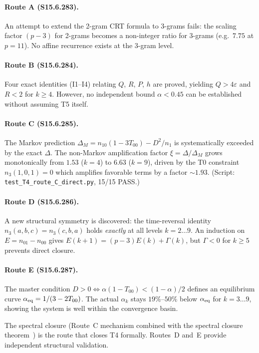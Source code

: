 \documentclass[12pt,a4paper]{article}
\begin{document}
\paragraph{Route A (S15.6.283).}
An attempt to extend the 2-gram CRT formula to 3-grams fails: the
scaling factor $(p-3)$ for 2-grams becomes a non-integer ratio for 3-grams
(e.g.\ $7.75$ at $p = 11$). No affine recurrence exists at the 3-gram level.

\paragraph{Route B (S15.6.284).}
Four exact identities (I1--I4) relating $Q$, $R$, $P$, $h$ are proved,
yielding $Q > 4\varepsilon$ and $R < 2$ for $k \geq 4$. However, no
independent bound $\alpha < 0.45$ can be established without
assuming T5 itself.

\paragraph{Route C (S15.6.285).}
The Markov prediction $\Delta_M = n_{10}(1 - 3T_{00}) - D^2/n_1$ is
systematically exceeded by the exact $\Delta$. The non-Markov
amplification factor $\xi = \Delta/\Delta_M$ grows monotonically from
$1.53$ ($k = 4$) to $6.63$ ($k = 9$), driven by the T0 constraint
$n_3(1,0,1) = 0$ which amplifies favorable terms by a factor $\sim 1.93$.
(Script: \texttt{test\_T4\_route\_C\_direct.py}, 15/15 PASS.)

\paragraph{Route D (S15.6.286).}
A new structural symmetry is discovered: the time-reversal identity
$n_3(a,b,c) = n_3(c,b,a)$ holds \emph{exactly} at all levels $k = 2\ldots 9$.
An induction on $E = n_{01} - n_{00}$ gives $E(k+1) = (p-3)E(k) + \Gamma(k)$,
but $\Gamma < 0$ for $k \geq 5$ prevents direct closure.

\paragraph{Route E (S15.6.287).}
The master condition $D > 0 \Leftrightarrow \alpha(1-T_{00}) < (1-\alpha)/2$
defines an equilibrium curve $\alpha_{\rm eq} = 1/(3-2T_{00})$.
The actual $\alpha_k$ stays $19\%$--$50\%$ below $\alpha_{\rm eq}$ for
$k = 3\ldots 9$, showing the system is well within the convergence basin.

\medskip\noindent
The spectral closure (Route~C mechanism combined with
the spectral closure theorem~\cite{companion_M3}) is the route that closes T4 formally.
Routes~D and~E provide independent structural validation.
\end{document}
